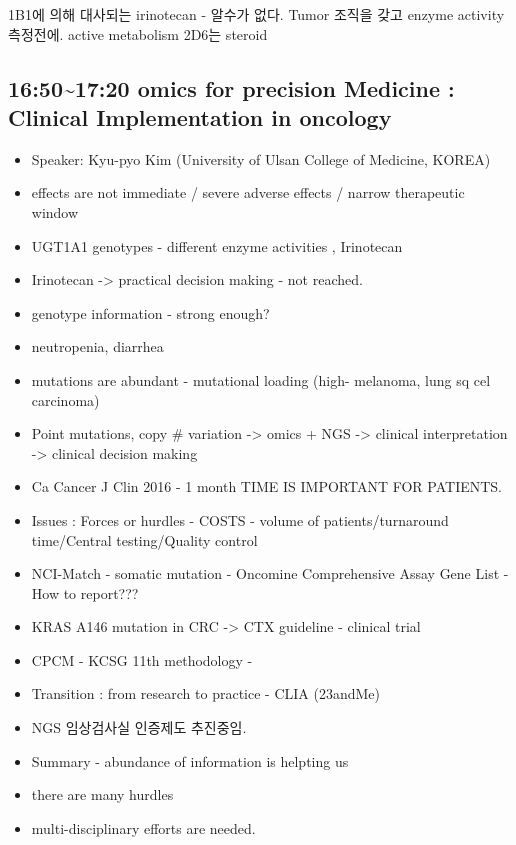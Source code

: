 \documentclass[]{book}
\providecommand{\tightlist}{%
  \setlength{\itemsep}{0pt}\setlength{\parskip}{0pt}}
\begin{document}
1B1에 의해 대사되는 irinotecan - 알수가 없다. Tumor 조직을 갖고 enzyme
activity 측정전에. active metabolism 2D6는 steroid

\subsection{16:50\textasciitilde{}17:20 omics for precision Medicine :
Clinical Implementation in
oncology}\label{omics-for-precision-medicine-clinical-implementation-in-oncology}

\begin{itemize}
\tightlist
\item
  Speaker: Kyu-pyo Kim (University of Ulsan College of Medicine, KOREA)
\item
  effects are not immediate / severe adverse effects / narrow
  therapeutic window
\item
  UGT1A1 genotypes - different enzyme activities , Irinotecan
\item
  Irinotecan -\textgreater{} practical decision making - not reached.
\item
  genotype information - strong enough?
\item
  neutropenia, diarrhea
\item
  mutations are abundant - mutational loading (high- melanoma, lung sq
  cel carcinoma)
\item
  Point mutations, copy \# variation -\textgreater{} omics + NGS
  -\textgreater{} clinical interpretation -\textgreater{} clinical
  decision making
\item
  Ca Cancer J Clin 2016 - 1 month TIME IS IMPORTANT FOR PATIENTS.
\item
  Issues : Forces or hurdles - COSTS - volume of patients/turnaround
  time/Central testing/Quality control
\item
  NCI-Match - somatic mutation - Oncomine Comprehensive Assay Gene List
  - How to report???
\item
  KRAS A146 mutation in CRC -\textgreater{} CTX guideline - clinical
  trial
\item
  CPCM - KCSG 11th methodology -
\item
  Transition : from research to practice - CLIA (23andMe)
\item
  NGS 임상검사실 인증제도 추진중임.
\item
  Summary - abundance of information is helpting us
\item
  there are many hurdles
\item
  multi-disciplinary efforts are needed.
\end{itemize}
\end{document}
